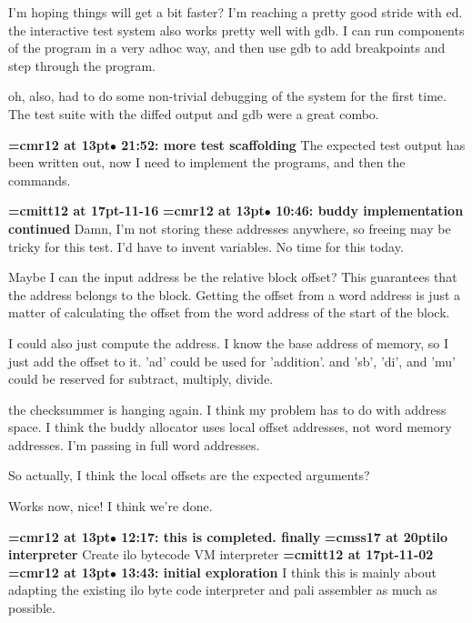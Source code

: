 I'm hoping things will get a bit faster? I'm reaching a pretty good stride with ed. the interactive test system also works pretty well with gdb. I can run components of the program in a very adhoc way, and then use gdb to add breakpoints and step through the program.
\par

oh, also, had to do some non-trivial debugging of the system for the first time. The test suite with the diffed output and gdb were a great combo.
\par

{\smallskip\noindent\bf\font\titlefont=cmr12 at 13pt\titlefont $\bullet$ 21:52: more test scaffolding}\smallskip
The expected test output has been written out, now I need to implement the programs, and then the commands.
\par

{\medskip\noindent\bf\font\titlefont=cmitt12 at 17pt-11-16}\medskip
{\smallskip\noindent\bf\font\titlefont=cmr12 at 13pt\titlefont $\bullet$ 10:46: buddy implementation continued}\smallskip
Damn, I'm not storing these addresses anywhere, so freeing may be tricky for this test. I'd have to invent variables. No time for this today.
\par

Maybe I can the input address be the relative block offset? This guarantees that the address belongs to the block. Getting the offset from a word address is just a matter of calculating the offset from the word address of the start of the block.
\par

I could also just compute the address. I know the base address of memory, so I just add the offset to it. 'ad' could be used for 'addition'. and 'sb', 'di', and 'mu' could be reserved for subtract, multiply, divide.
\par

the checksummer is hanging again. I think my problem has to do with address space. I think the buddy allocator uses local offset addresses, not word memory addresses. I'm passing in full word addresses.
\par

So actually, I think the local offsets are the expected arguments?
\par

Works now, nice! I think we're done.
\par

{\smallskip\noindent\bf\font\titlefont=cmr12 at 13pt\titlefont $\bullet$ 12:17: this is completed. finally}\smallskip
{}
{\medskip\noindent\bf\font\titlefont=cmss17 at 20pt\titlefont ilo interpreter}\medskip
Create ilo bytecode VM interpreter
{\medskip\noindent\bf\font\titlefont=cmitt12 at 17pt-11-02}\medskip
{\smallskip\noindent\bf\font\titlefont=cmr12 at 13pt\titlefont $\bullet$ 13:43: initial exploration}\smallskip
I think this is mainly about adapting the existing ilo byte code interpreter and pali assembler as much as possible.
\par

